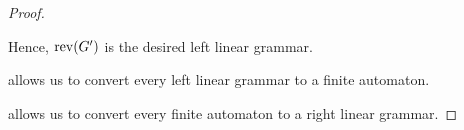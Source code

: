 \begin{proof}
\begin{itemize}
    Hence, \( \operatorname{rev}(G') \) is the desired left linear grammar.
  \end{itemize}

    allows us to convert every left linear grammar to a finite automaton.

    allows us to convert every finite automaton to a right linear grammar.
\end{proof}
